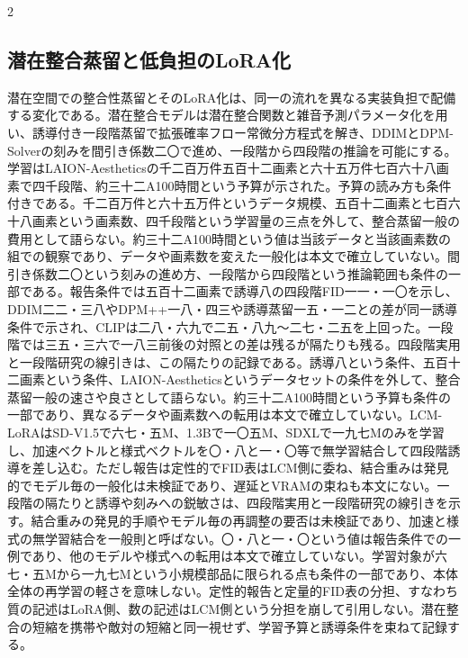 \documentclass[lualatex,a4paper,10pt]{jlreq}
\begin{document}
\begin{multicols}{2}
\subsection{潜在整合蒸留と低負担のLoRA化}
潜在空間での整合性蒸留とそのLoRA化は、同一の流れを異なる実装負担で配備する変化である。潜在整合モデルは潜在整合関数と雑音予測パラメータ化を用い、誘導付き一段階蒸留で拡張確率フロー常微分方程式を解き、DDIMとDPM-Solverの刻みを間引き係数二〇で進め、一段階から四段階の推論を可能にする。学習はLAION-Aestheticsの千二百万件五百十二画素と六十五万件七百六十八画素で四千段階、約三十二A100時間という予算が示された\autocite{btd079}。予算の読み方も条件付きである。千二百万件と六十五万件というデータ規模、五百十二画素と七百六十八画素という画素数、四千段階という学習量の三点を外して、整合蒸留一般の費用として語らない。約三十二A100時間という値は当該データと当該画素数の組での観察であり、データや画素数を変えた一般化は本文で確立していない。間引き係数二〇という刻みの進め方、一段階から四段階という推論範囲も条件の一部である\autocite{btd079}。報告条件では五百十二画素で誘導八の四段階FID一一・一〇を示し、DDIM二二・三八やDPM++一八・四三や誘導蒸留一五・一二との差が同一誘導条件で示され、CLIPは二八・六九で二五・八九〜二七・二五を上回った。一段階では三五・三六で一八三前後の対照との差は残るが隔たりも残る\autocite{btd079}。四段階実用と一段階研究の線引きは、この隔たりの記録である。誘導八という条件、五百十二画素という条件、LAION-Aestheticsというデータセットの条件を外して、整合蒸留一般の速さや良さとして語らない。約三十二A100時間という予算も条件の一部であり、異なるデータや画素数への転用は本文で確立していない\autocite{btd079}。LCM-LoRAはSD-V1.5で六七・五M、1.3Bで一〇五M、SDXLで一九七Mのみを学習し、加速ベクトルと様式ベクトルを〇・八と一・〇等で無学習結合して四段階誘導を差し込む。ただし報告は定性的でFID表はLCM側に委ね、結合重みは発見的でモデル毎の一般化は未検証であり、遅延とVRAMの束ねも本文にない\autocite{btd080}。一段階の隔たりと誘導や刻みへの鋭敏さは、四段階実用と一段階研究の線引きを示す。結合重みの発見的手順やモデル毎の再調整の要否は未検証であり、加速と様式の無学習結合を一般則と呼ばない\autocite{btd080}。〇・八と一・〇という値は報告条件での一例であり、他のモデルや様式への転用は本文で確立していない。学習対象が六七・五Mから一九七Mという小規模部品に限られる点も条件の一部であり、本体全体の再学習の軽さを意味しない。定性的報告と定量的FID表の分担、すなわち質の記述はLoRA側、数の記述はLCM側という分担を崩して引用しない\autocite{btd080}。潜在整合の短縮を携帯や敵対の短縮と同一視せず、学習予算と誘導条件を束ねて記録する\autocite{btd079,btd080}。
\end{multicols}
\end{document}
